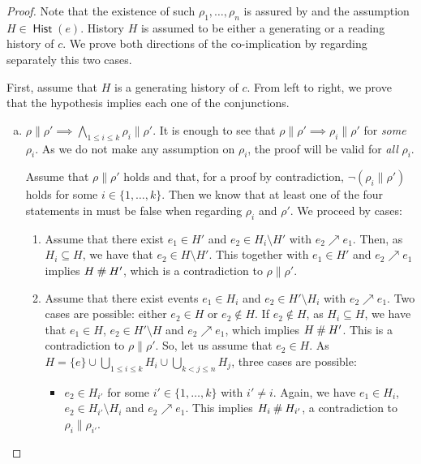 \documentclass[12pt,a4paper]{article}
\newcommand{\hist}[1]{\ensuremath{\mathop{\mathsf{Hist}}{(#1)}}}
\newcommand{\confl}{\ensuremath\mathbin\#}
\begin{document}
\begin{proof}
Note that the existence of such $\rho_1, \ldots, \rho_n$ is assured by
 and the assumption $H \in \hist{e}$.  History $H$ is assumed
to be either a generating or a reading history of $c$.  We prove both
directions of the co-implication by regarding separately this two cases.

First, assume that $H$ is a generating history of $c$.  From left to right, we
prove that the hypothesis implies each one of the conjunctions.


\begin{enumerate}[(a)]
\item $\rho \parallel \rho' \implies \bigwedge_{1 \le i \le k} \rho_i \parallel
\rho'$.  It is enough to see that $\rho \parallel \rho' \implies \rho_i
\parallel \rho'$ for \emph{some} $\rho_i$.  As we do not make any assumption on
$\rho_i$, the proof will be valid for \emph{all} $\rho_i$.

Assume that $\rho \parallel \rho'$ holds and that, for a proof by contradiction,
$\lnot (\rho_i \parallel \rho')$ holds for some $i \in \{1, \ldots, k\}$.  Then we
know that at least one of the four statements in  must be
false when regarding $\rho_i$ and $\rho'$.  We proceed by cases:

\begin{enumerate}[1.]
\item Assume that there exist $e_1 \in H'$ and $e_2 \in H_i \setminus H'$ with
$e_2 \nearrow e_1$.  Then, as $H_i \subseteq H$, we have that $e_2 \in H
\setminus H'$.  This together with $e_1 \in H'$ and $e_2 \nearrow e_1$ implies
$H \confl H'$, which is a contradiction to $\rho \parallel \rho'$.

\item Assume that there exist events $e_1 \in H_i$ and $e_2 \in H' \setminus
H_i$ with $e_2 \nearrow e_1$.  Two cases are possible: either $e_2 \in H$ or
$e_2 \notin H$.  If $e_2 \notin H$, as $H_i \subseteq H$, we have that $e_1 \in
H$, $e_2 \in H' \setminus H$ and $e_2 \nearrow e_1$, which implies $H \confl
H'$.  This is a contradiction to $\rho \parallel \rho'$.  So, let us assume
that $e_2 \in H$.  As $H = \{e\} \cup \bigcup_{1 \le i \le k} H_i \cup
\bigcup_{k < j \le n} H_j$, three cases are possible:

\begin{itemize}
\item $e_2 \in H_{i'}$ for some $i' \in \{1, \ldots, k\}$ with $i' \ne i$.
Again, we have $e_1 \in H_i$, $e_2 \in H_{i'} \setminus H_i$ and $e_2 \nearrow
e_1$.  This implies $H_i \confl H_{i'}$, a contradiction to $\rho_i \parallel
\rho_{i'}$.


\end{itemize}
\end{enumerate}
\end{enumerate}
\end{proof}
\end{document}
